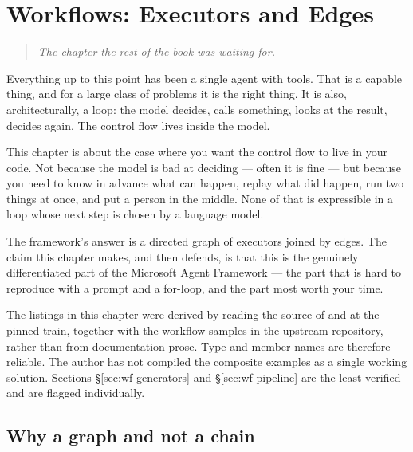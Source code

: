 \chapter{Workflows: Executors and Edges}
\label{ch:workflows-basics}

\begin{quote}\itshape
The chapter the rest of the book was waiting for.
\end{quote}

\noindent
Everything up to this point has been a single agent with tools. That is a
capable thing, and for a large class of problems it is the right thing. It is
also, architecturally, a loop: the model decides, calls something, looks at the
result, decides again. The control flow lives inside the model.

This chapter is about the case where you want the control flow to live in your
code. Not because the model is bad at deciding --- often it is fine --- but
because you need to know in advance what can happen, replay what did happen, run
two things at once, and put a person in the middle. None of that is expressible
in a loop whose next step is chosen by a language model.

The framework's answer is a directed graph of executors joined by edges. The
claim this chapter makes, and then defends, is that this is the genuinely
differentiated part of the Microsoft Agent Framework --- the part that is hard to
reproduce with a prompt and a for-loop, and the part most worth your time.

\begin{verifybox}
The listings in this chapter were derived by reading the source of
 and 
at the pinned train, together with the workflow samples in the upstream
repository, rather than from documentation prose. Type and member names are
therefore reliable. The author has not compiled the composite examples as a
single working solution. Sections \S\ref{sec:wf-generators} and
\S\ref{sec:wf-pipeline} are the least verified and are flagged individually.
\end{verifybox}

\section{Why a graph and not a chain}
\label{sec:wf-why-graph}

